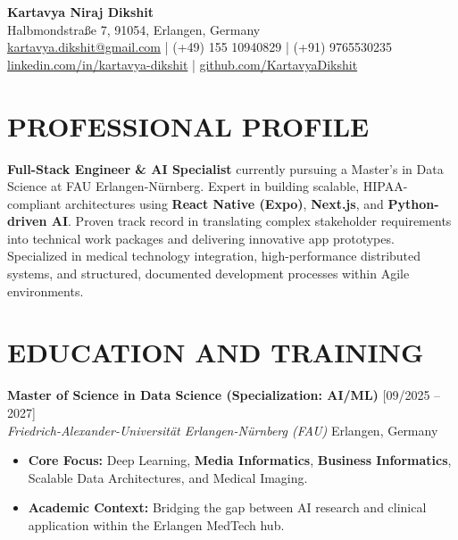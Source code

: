 \documentclass[10pt, a4paper]{article}
\begin{document}
\begin{center}
    {\Huge \bfseries \color{primarycolor} Kartavya Niraj Dikshit} \\
    \vspace{6pt}
    Halbmondstraße 7, 91054, Erlangen, Germany \\
    \vspace{3pt}
    \href{mailto:kartavya.dikshit@gmail.com}{kartavya.dikshit@gmail.com} | (+49) 155 10940829 | (+91) 9765530235 \\
    \vspace{3pt}
    \href{http://www.linkedin.com/in/kartavya-dikshit}{linkedin.com/in/kartavya-dikshit} | \href{https://github.com/KartavyaDikshit}{github.com/KartavyaDikshit}
\end{center}

\section{PROFESSIONAL PROFILE}
\textbf{Full-Stack Engineer \& AI Specialist} currently pursuing a Master’s in Data Science at FAU Erlangen-Nürnberg. Expert in building scalable, HIPAA-compliant architectures using \textbf{React Native (Expo)}, \textbf{Next.js}, and \textbf{Python-driven AI}. Proven track record in translating complex stakeholder requirements into technical work packages and delivering innovative app prototypes. Specialized in medical technology integration, high-performance distributed systems, and structured, documented development processes within Agile environments.

\section{EDUCATION AND TRAINING}
\textbf{Master of Science in Data Science (Specialization: AI/ML)} \hfill [09/2025 – 2027] \\
\textit{Friedrich-Alexander-Universität Erlangen-Nürnberg (FAU)} \hfill Erlangen, Germany
\begin{itemize}
    \item \textbf{Core Focus:} Deep Learning, \textbf{Media Informatics}, \textbf{Business Informatics}, Scalable Data Architectures, and Medical Imaging.
    \item \textbf{Academic Context:} Bridging the gap between AI research and clinical application within the Erlangen MedTech hub.
\end{itemize}
\end{document}
